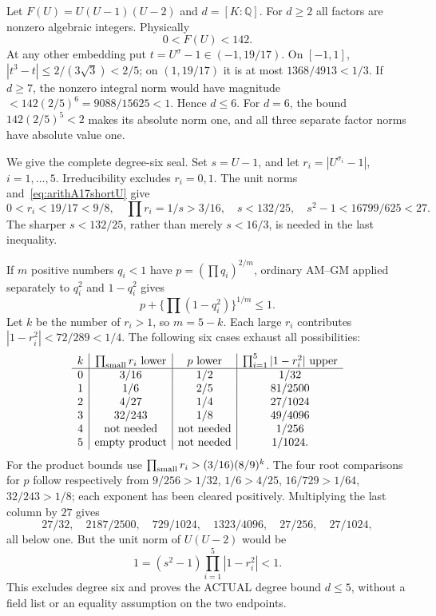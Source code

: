 Let \(F(U)=U(U-1)(U-2)\) and \(d=[K:\mathbb Q]\).
For \(d\ge2\) all factors are nonzero algebraic integers.
Physically
\[
                    0<F(U)<142 .
\]
At any other embedding put \(t=U^\sigma-1\in(-1,19/17)\).
On \([-1,1]\), \(|t^3-t|\le2/(3\sqrt3)<2/5\);
on \((1,19/17)\) it is at most \(1368/4913<1/3\).
If \(d\ge7\), the nonzero integral norm would have magnitude
\(<142(2/5)^6=9088/15625<1\).
Hence \(d\le6\).
For \(d=6\), the bound \(142(2/5)^5<2\) makes its absolute
norm one, and all three separate factor norms have absolute
value one.

We give the complete degree-six seal.
Set \(s=U-1\), and let
\(r_i=|U^{\sigma_i}-1|\), \(i=1,\ldots,5\).
Irreducibility excludes \(r_i=0,1\).
The unit norms and~\eqref{eq:arithA17shortU} give
\[
 0<r_i<19/17<9/8,\quad
 \prod r_i=1/s>3/16,\quad s<132/25,\quad
 s^2-1<16799/625<27.
\]
The sharper \(s<132/25\), rather than merely \(s<16/3\),
is needed in the last inequality.

If \(m\) positive numbers \(q_i<1\) have
\(p=(\prod q_i)^{2/m}\), ordinary AM--GM applied separately
to \(q_i^2\) and \(1-q_i^2\) gives
\[
       p+\{\prod(1-q_i^2)\}^{1/m}\le1 .
\]
Let \(k\) be the number of \(r_i>1\), so \(m=5-k\).
Each large \(r_i\) contributes
\(|1-r_i^2|<72/289<1/4\).
The following six cases exhaust all possibilities:
\[
\begin{array}{c|c|c|c}
k&\prod_{\rm small}r_i\text{ lower}&
 p\text{ lower}&\prod_{i=1}^5|1-r_i^2|\text{ upper}\\ \hline
0&3/16&1/2&1/32\\
1&1/6&2/5&81/2500\\
2&4/27&1/4&27/1024\\
3&32/243&1/8&49/4096\\
4&\text{not needed}&\text{not needed}&1/256\\
5&\text{empty product}&\text{not needed}&1/1024 .
\end{array}
\]
For the product bounds use
\(\prod_{\rm small}r_i>(3/16)(8/9)^k\).
The four root comparisons for \(p\) follow respectively from
\(9/256>1/32\), \(1/6>4/25\), \(16/729>1/64\),
\(32/243>1/8\); each exponent has been cleared positively.
Multiplying the last column by \(27\) gives
\[
 27/32,\quad2187/2500,\quad729/1024,\quad
 1323/4096,\quad27/256,\quad27/1024,
\]
all below one.
But the unit norm of \(U(U-2)\) would be
\[
             1=(s^2-1)\prod_{i=1}^5|1-r_i^2|<1 .
\]
This excludes degree six and proves the ACTUAL degree bound
\(d\le5\), without a field list or an equality assumption on the
two endpoints.

